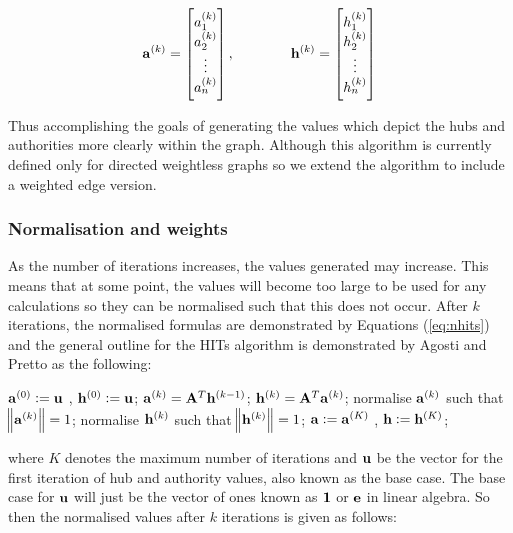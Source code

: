 \begin{equation}
\bold{a}^{(k)} = \begin{bmatrix}
           a_1^{(k)} \\
           a_2^{(k)} \\
           \vdots \\
           a_n^{(k)}
         	\end{bmatrix}
           , \qquad \qquad 
\bold{h}^{(k)} = \begin{bmatrix}
           h_{1}^{(k)} \\
           h_{2}^{(k)} \\
           \vdots \\
           h_{n}^{(k)}
         	\end{bmatrix}
\end{equation}

Thus accomplishing the goals of generating the values which depict the hubs and authorities more clearly within the graph. Although this algorithm is currently defined only for directed weightless graphs so we extend the algorithm to include a weighted edge version.

\subsubsection{Normalisation and weights}
As the number of iterations increases, the values generated may increase. This means that at some point, the values will become too large to be used for any calculations so they can be normalised such that this does not occur. After $k$ iterations, the normalised formulas are demonstrated by Equations (\ref{eq:nhits}) and the general outline for the HITs algorithm is demonstrated by Agosti and Pretto\cite{agosti2005theoretical} as the following:

\begin{algorithmic}
\State $\bold{a}^{(0)} := \bold{u}$ ,   $\bold{h}^{(0)} := \bold{u}$;
   		 \State \qquad $\bold{a}^{(k)} = \bold{A}^{T}\bold{h}^{(k-1)}$;
		 \State \qquad $\bold{h}^{(k)} = \bold{A}^{T}\bold{a}^{(k)}$;
		 \State \qquad normalise $\bold{a}^{(k)}$ such that $\norm{\bold{a}^{(k)}} = 1$;
		 \State \qquad normalise $\bold{h}^{(k)}$ such that $\norm{\bold{h}^{(k)}} = 1$;
\EndFor 
\State $\bold{a} := \bold{a}^{(K)}$ ,   $\bold{h} := \bold{h}^{(K)}$;
\end{algorithmic}

where $K$ denotes the maximum number of iterations and $\bold{u}$ be the vector for the first iteration of hub and authority values, also known as the base case. The base case for $\bold{u}$ will just be the vector of ones known as $\bold{1}$ or $\bold{e}$ in linear algebra. So then the normalised values after $k$ iterations is given as follows:

